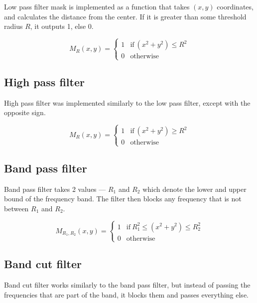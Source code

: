 \documentclass[12pt]{article}
\begin{document}
Low pass filter mask is implemented as a function that takes $(x,y)$ coordinates, and calculates the distance from the center.
If it is greater than some threshold radius $R$, it outputs 1, else 0.

\begin{equation}
    M_R(x,y) = \begin{cases}
        1  &\text{if} \ (x^2 + y^2) \leq R^2 \\
        0  &\text{otherwise}
    \end{cases}
\end{equation}

\subsection{High pass filter}

High pass filter was implemented similarly to the low pass filter, except with the opposite sign.

\begin{equation}
    M_R(x,y) = \begin{cases}
        1  &\text{if} \ (x^2 + y^2) \geq R^2 \\
        0  &\text{otherwise}
    \end{cases}
\end{equation}

\subsection{Band pass filter}

Band pass filter takes 2 values --- $R_1$ and $R_2$ which denote the lower and upper bound of the frequency band.
The filter then blocks any frequency that is not between $R_1$ and $R_2$.

\begin{equation}
    M_{R_1, R_2}(x,y) = \begin{cases}
        1  &\text{if} \ R_1^2 \leq (x^2 + y^2) \leq R_2^2  \\
        0  &\text{otherwise}
    \end{cases}
\end{equation}

\subsection{Band cut filter}

Band cut filter works similarly to the band pass filter, but instead of passing the frequencies that are part of the band, it blocks them and passes everything else.
\end{document}
